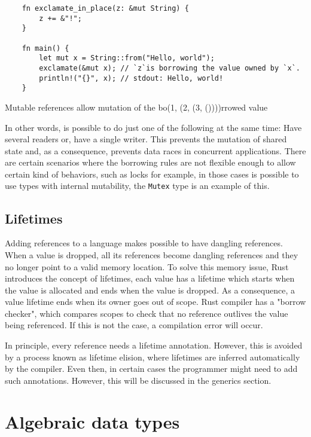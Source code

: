 \begin{listing}[h]
	\begin{verbatim}
    fn exclamate_in_place(z: &mut String) {
        z += &"!";    
    }

    fn main() {
        let mut x = String::from("Hello, world");
        exclamate(&mut x); // `z`is borrowing the value owned by `x`.
        println!("{}", x); // stdout: Hello, world!
    }
	\end{verbatim}
  \caption{Mutable references allow mutation of the bo(1, (2, (3, ())))rrowed value}
  \label{lst:mutable_ref}
\end{listing}

In other words, is possible to do just one of the following at the same time: Have several readers or, have a single writer. This prevents the mutation of shared state and, as a consequence, prevents data races in concurrent applications. There are certain scenarios where the borrowing rules are not flexible enough to allow certain kind of behaviors, such as locks for example, in those cases is possible to use types with internal mutability, the \texttt{Mutex} type is an example of this.

\subsection{Lifetimes}
Adding references to a language makes possible to have dangling references. When a value is dropped, all its references become dangling references and they no longer point to a valid memory location. To solve this memory issue, Rust introduces the concept of lifetimes, each value has a lifetime which starts when the value is allocated and ends when the value is dropped. As a consequence, a value lifetime ends when its owner goes out of scope. Rust compiler has a "borrow checker", which compares scopes to check that no reference outlives the value being referenced. If this is not the case, a compilation error will occur.

In principle, every reference needs a lifetime annotation. However, this is avoided by a process known as lifetime elision, where lifetimes are inferred automatically by the compiler. Even then, in certain cases the programmer might need to add such annotations. However, this will be discussed in the generics section.

\section{Algebraic data types}
